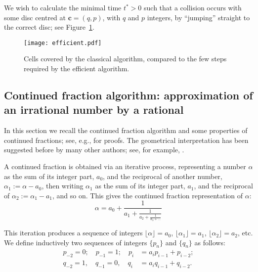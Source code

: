 \documentclass[pre,amsmath,amssymb, twocolumn, showpacs]{revtex4-1}
\renewcommand{\vec}[1]{\mathbf{#1}}
\begin{document}
We wish to calculate the minimal time $t^{\ast}>0$ such that a collision occurs with some disc centred at $\vec{c} = (q,p)$, with $q$ and $p$ integers, by ``jumping'' straight to the correct disc; see Figure~\ref{fig:efficient}.


\begin{figure}
\centering
\texttt{[image: efficient.pdf]}
\caption{Cells covered by the classical algorithm, compared to the few steps required by the efficient algorithm.}
\label{fig:efficient}
\end{figure}


\subsection{Continued fraction algorithm: approximation of an irrational number by a rational}

In this section we recall the continued fraction algorithm and some properties of continued fractions; see, e.g., 
\cite{niven2008introduction} for proofs. The geometrical interpretation has been suggested before by many other authors; see, for example, \cite{nogueira1995three}. 

A continued fraction is obtained via an iterative process, representing a number $\alpha$ as the sum of its integer part, $a_0$, and the reciprocal of another number, $\alpha_1:=\alpha-a_0$, then writing $\alpha_1$ as the sum of its integer part, $a_1$, and the reciprocal of $\alpha_2:=\alpha_1-a_1$, and so on. This gives the continued fraction representation of $\alpha$:
\begin{equation*}
  \alpha = a_0 + \frac{1}{\displaystyle a_1
          + \frac{1}{\displaystyle a_2
          + \frac{1}{\displaystyle a_3 + \dots}}}
\end{equation*}

This iteration produces a sequence of integers $\lfloor \alpha \rfloor=a_0$, $\lfloor \alpha_1 \rfloor=a_1$, $\lfloor \alpha_2 \rfloor=a_2$, etc. 
We define inductively two sequences of integers $\{ p_n\}$ and $\{ q_n\}$ as follows:
%
\begin{eqnarray}
p_{-2} = 0;  \quad p_{-1} = 1;  \quad p_i &=a_i p_{i-1}+p_{i-2};
\label{eq:sucesion1}
\\ 
q_{-2} = 1,  \quad q_{-1} = 0,  \quad q_i &=a_i q_{i-1}+q_{i-2}.
\label{eq:sucesion2}
\end{eqnarray}
\end{document}
